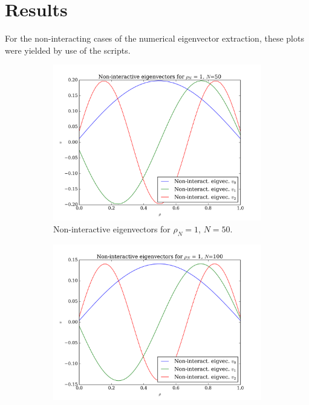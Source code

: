 \documentclass[11pt,a4paper,notitlepage]{article}
\begin{document}
\section{Results}
For the non-interacting cases of the numerical eigenvector extraction, these plots were yielded by use of the scripts.
\begin{figure}[H]
\center
    \begin{subfigure}[t]{0.45\textwidth}
        \includegraphics[scale=0.40]{../non_interacting_eigvec_plot_rhoN=1_N=50.png}
        \caption{Non-interactive eigenvectors for $\rho_N = 1$, $N = 50$.}\label{fig:eigvecs-non-interact-1-50}
    \end{subfigure}
    \hfill
    \begin{subfigure}[t]{0.45\textwidth}
        \includegraphics[scale=0.40]{../non_interacting_eigvec_plot_rhoN=1_N=100.png}

\end{subfigure}
\end{figure}
\end{document}
